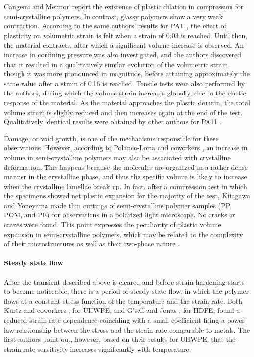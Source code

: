 Cangemi and Meimon \citep{cangemiTwoPhaseModelMechanical2001} report the existence of plastic dilation in compression for semi-crystalline polymers.
In contrast, glassy polymers show a very weak contraction.
According to the same authors' results for PA11, the effect of plasticity on volumetric strain is felt when a strain of \num{0.03} is reached.
Until then, the material contracts, after which a significant volume increase is observed.
An increase in confining pressure was also investigated, and the authors discovered that it resulted in a qualitatively similar evolution of the volumetric strain, though it was more pronounced in magnitude, before attaining approximately the same value after a strain of \num{0.16} is reached.
Tensile tests were also performed by the authors, during which the volume strain increases globally, due to the elastic response of the material.
As the material approaches the plastic domain, the total volume strain is slighly reduced and then increases again at the end of the test.
Qualitatively identical results were obtained by other authors for PA11 \citep{marchalInfluenceCheminChargement1996}.

Damage, or void growth, is one of the mechanisms responsible for these observations.
However, according to Polanco-Loria and coworkers \citep{polanco-loriaConstitutiveModelThermoplastics2010}, an increase in volume in semi-crystalline polymers may also be associated with crystalline deformation.
This happens because the molecules are organized in a rather dense manner in the crystalline phase, and thus the specific volume is likely to increase when the crystalline lamellae break up.
In fact, after a compression test in which the specimens showed net plastic expansion for the majority of the test, Kitagawa and Yoneyama \citep{kitagawaPlasticDilatationDue1988} made thin cuttings of semi-crystalline polymer samples (PP, POM, and PE) for observations in a polarized light microscope.
No cracks or crazes were found.
This point expresses the peculiarity of plastic volume expansion in semi-crystalline polymers, which may be related to the complexity of their microstructures as well as their two-phase nature \citep{cangemiTwoPhaseModelMechanical2001}.

\paragraph{Steady state flow}

After the transient described above is cleared and before strain hardening starts to become noticeable, there is a period of steady state flow, in which the polymer flows at a constant stress function of the temperature and the strain rate.
Both Kurtz and coworkers \citep{kurtzThermomechanicalBehaviorVirgin2002}, for UHWPE, and G'sell and Jonas \citep{gsellDeterminationPlasticBehaviour1979}, for HDPE, found a reduced strain rate dependence coinciding with a small coefficient fiting a power law relationship between the stress and the strain rate comparable to metals.
The first authors point out, however, based on their results for UHWPE, that the strain rate sensitivity increases significantly with temperature.

